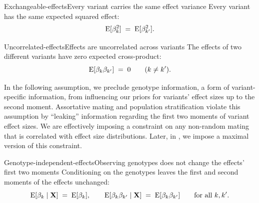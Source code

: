 \documentclass[12pt]{article}
\begin{document}
\begin{assumption}{Exchangeable-effects}{Every variant carries the same effect variance}
Every variant has the same expected squared effect:
$$ \mathrm{E}[\beta_k^2] \;=\; \mathrm{E}[\beta_{k'}^2] . $$

\end{assumption}

\begin{assumption}{Uncorrelated-effects}{Effects are uncorrelated across variants}
The effects of two different variants have zero expected cross-product:
$$ \mathrm{E}[\beta_k \beta_{k'}] \;=\; 0 \qquad (k \neq k') . $$
\end{assumption}

In the following assumption, we preclude genotype information, a form of variant-specific information, from influencing our priors for variants' effect sizes up to the second moment.
Assortative mating and population stratification violate this assumption by ``leaking'' information regarding the first two moments of variant effect sizes.
We are effectively imposing a constraint on any non-random mating that is correlated with effect size distributions.
Later, in , we impose a maximal version of this constraint.

\begin{assumption}{Genotype-independent-effects}{Observing genotypes does not change the effects' first two moments}
Conditioning on the genotypes leaves the first and second moments of the effects unchanged:
$$ \mathrm{E}[\beta_k \mid \mathbf{X}] \;=\; \mathrm{E}[\beta_k], \qquad \mathrm{E}[\beta_k \beta_{k'} \mid \mathbf{X}] \;=\; \mathrm{E}[\beta_k \beta_{k'}] \qquad \text{for all } k, k' . $$
\end{assumption}
\end{document}
